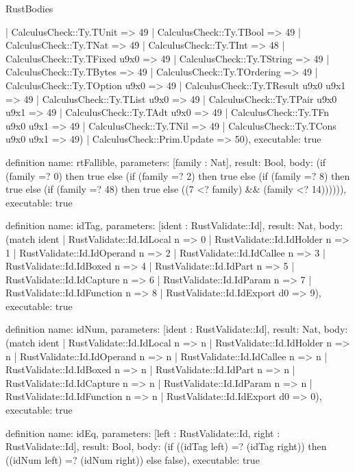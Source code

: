 \begin{lexlean}{RustBodies}
\begin{semanticmodule}
{      | CalculusCheck::Ty.TUnit => 49
      | CalculusCheck::Ty.TBool => 49
      | CalculusCheck::Ty.TNat => 49
      | CalculusCheck::Ty.TInt => 48
      | CalculusCheck::Ty.TFixed u9x0 => 49
      | CalculusCheck::Ty.TString => 49
      | CalculusCheck::Ty.TBytes => 49
      | CalculusCheck::Ty.TOrdering => 49
      | CalculusCheck::Ty.TOption u9x0 => 49
      | CalculusCheck::Ty.TResult u9x0 u9x1 => 49
      | CalculusCheck::Ty.TList u9x0 => 49
      | CalculusCheck::Ty.TPair u9x0 u9x1 => 49
      | CalculusCheck::Ty.TAdt u9x0 => 49
      | CalculusCheck::Ty.TFn u9x0 u9x1 => 49
      | CalculusCheck::Ty.TNil => 49
      | CalculusCheck::Ty.TCons u9x0 u9x1 => 49)
    | CalculusCheck::Prim.Update => 50),
  executable: true
}

definition{
  name: rtFallible,
  parameters: [family : Nat],
  result: Bool,
  body: (if (family =? 0) then true else (if (family =? 2) then true else (if (family =? 8) then true else (if (family =? 48) then true else ((7 <? family) && (family <? 14)))))),
  executable: true
}

definition{
  name: idTag,
  parameters: [ident : RustValidate::Id],
  result: Nat,
  body: (match ident
    | RustValidate::Id.IdLocal n => 0
    | RustValidate::Id.IdHolder n => 1
    | RustValidate::Id.IdOperand n => 2
    | RustValidate::Id.IdCallee n => 3
    | RustValidate::Id.IdBoxed n => 4
    | RustValidate::Id.IdPart n => 5
    | RustValidate::Id.IdCapture n => 6
    | RustValidate::Id.IdParam n => 7
    | RustValidate::Id.IdFunction n => 8
    | RustValidate::Id.IdExport d0 => 9),
  executable: true
}

definition{
  name: idNum,
  parameters: [ident : RustValidate::Id],
  result: Nat,
  body: (match ident
    | RustValidate::Id.IdLocal n => n
    | RustValidate::Id.IdHolder n => n
    | RustValidate::Id.IdOperand n => n
    | RustValidate::Id.IdCallee n => n
    | RustValidate::Id.IdBoxed n => n
    | RustValidate::Id.IdPart n => n
    | RustValidate::Id.IdCapture n => n
    | RustValidate::Id.IdParam n => n
    | RustValidate::Id.IdFunction n => n
    | RustValidate::Id.IdExport d0 => 0),
  executable: true
}

definition{
  name: idEq,
  parameters: [left : RustValidate::Id, right : RustValidate::Id],
  result: Bool,
  body: (if ((idTag left) =? (idTag right)) then ((idNum left) =? (idNum right)) else false),
  executable: true
}


\end{semanticmodule}
\end{lexlean}
